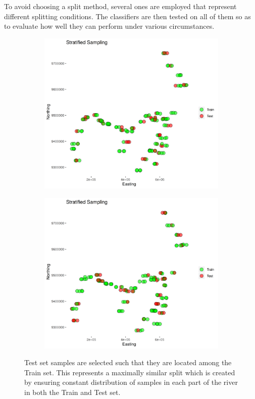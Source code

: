 To avoid choosing a split method, several ones are employed that represent different splitting conditions. The classifiers are then tested on all of them so as to evaluate how well they can perform under various circumstances.
\begin{figure}[h]
\centering
\begin{subfigure}{0.4\textwidth}
\includegraphics[width = \textwidth]{stratsamp.png}
\end{subfigure}
\begin{subfigure}{0.4\textwidth}
\includegraphics[width = \textwidth]{stratsamp2.png}
\end{subfigure}
\caption{Test set samples are selected such that they are located among the Train set. This represents a maximally similar split which is created by ensuring constant distribution of samples in each part of the river in both the Train and Test set.}
\label{fig:stratsampl}
\end{figure}

